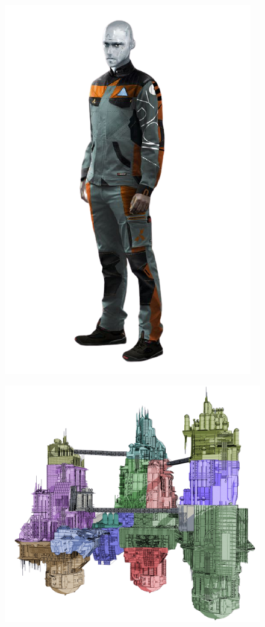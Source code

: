 \begin{figure}
    \centering
    \includegraphics[width=.55\textwidth]{img/bg/working-joe.png}
    \label{fig:refinery}
\end{figure}

\clearpage


\begin{figure}
    \centering
    \includegraphics[width=1.0\textwidth]{img/bg/station.png}
\end{figure}



